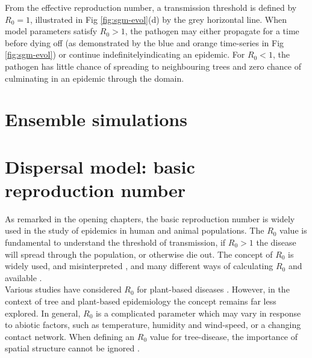 From the effective reproduction number, a transmission threshold is defined by $R_0=1$, illustrated in Fig \ref{fig:sgm-evol}(d) by the grey horizontal line. When model parameters satisfy $R_0>1$, the pathogen may either propagate for a time before dying off (as demonstrated by the blue and orange time-series in Fig \ref{fig:sgm-evol}) or continue indefinitely\textemdash indicating an epidemic. For $R_0<1$, the pathogen has little chance of spreading to neighbouring trees and zero chance of culminating in an epidemic through the domain\protect\footnotemark {}.\\

\section{Ensemble simulations}

\blindtext

\blindtext

\blindtext

\section{Dispersal model: basic reproduction number}


As remarked in the opening chapters, the basic reproduction number is widely used in the %
study of epidemics in human and animal populations. %
The $R_0$ value is fundamental to understand the threshold of transmission, if $R_0>1$ the %
disease will spread through the population, or otherwise die out. The concept of $R_0$ is %
widely used, and misinterpreted \cite{delamater2019complexity}, and many different ways of %
calculating $R_0$ and available \cite{perspectives-on-r0}.\\

Various studies have considered $R_0$ for plant-based diseases %
\cite{gubbins2000population, park2001invasion, doi:10.1146/annurev.phyto.011108.135838, van2011periodic, mikaberidze2016invasiveness}. %
However, in the context of tree and plant-based epidemiology the concept remains far less %
explored. In general, $R_0$ is a complicated parameter which may vary in response to abiotic %
factors, such as temperature, humidity and wind-speed, or a changing contact network. %
When defining an $R_0$ value for tree-disease, the importance of spatial structure cannot be %
ignored \cite{park2001invasion}.\\

